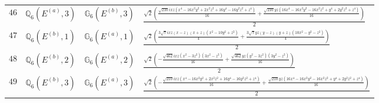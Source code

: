 \documentclass[fleqn,8pt,landscape]{jsarticle}
\begin{document}
\begin{table}[ht!]
\begin{center}
\begin{tabular}{cccl}
$ 46 $ & $ \mathbb{Q}_{6}(E^{(a)},3) $ & $ \mathbb{G}_{6}(E^{(b)},3) $ & $ \frac{\sqrt{2} \left(\frac{\sqrt{210} i x z \left(x^{4} - 16 x^{2} y^{2} + 2 x^{2} z^{2} + 16 y^{4} - 16 y^{2} z^{2} + z^{4}\right)}{16} + \frac{\sqrt{210} y z \left(16 x^{4} - 16 x^{2} y^{2} - 16 x^{2} z^{2} + y^{4} + 2 y^{2} z^{2} + z^{4}\right)}{16}\right)}{2} $ \\
$ 47 $ & $ \mathbb{Q}_{6}(E^{(b)},1) $ & $ \mathbb{G}_{6}(E^{(a)},1) $ & $ \frac{\sqrt{2} \left(\frac{3 \sqrt{7} i x z \left(x - z\right) \left(x + z\right) \left(x^{2} - 10 y^{2} + z^{2}\right)}{4} + \frac{3 \sqrt{7} y z \left(y - z\right) \left(y + z\right) \left(10 x^{2} - y^{2} - z^{2}\right)}{4}\right)}{2} $ \\
$ 48 $ & $ \mathbb{Q}_{6}(E^{(b)},2) $ & $ \mathbb{G}_{6}(E^{(a)},2) $ & $ \frac{\sqrt{2} \left(- \frac{\sqrt{462} i x z \left(x^{2} - 3 z^{2}\right) \left(3 x^{2} - z^{2}\right)}{16} + \frac{\sqrt{462} y z \left(y^{2} - 3 z^{2}\right) \left(3 y^{2} - z^{2}\right)}{16}\right)}{2} $ \\
$ 49 $ & $ \mathbb{Q}_{6}(E^{(b)},3) $ & $ \mathbb{G}_{6}(E^{(a)},3) $ & $ \frac{\sqrt{2} \left(- \frac{\sqrt{210} i x z \left(x^{4} - 16 x^{2} y^{2} + 2 x^{2} z^{2} + 16 y^{4} - 16 y^{2} z^{2} + z^{4}\right)}{16} + \frac{\sqrt{210} y z \left(16 x^{4} - 16 x^{2} y^{2} - 16 x^{2} z^{2} + y^{4} + 2 y^{2} z^{2} + z^{4}\right)}{16}\right)}{2} $ \\
 \hline \hline
\end{tabular}
\end{center}
\end{table}
\end{document}
